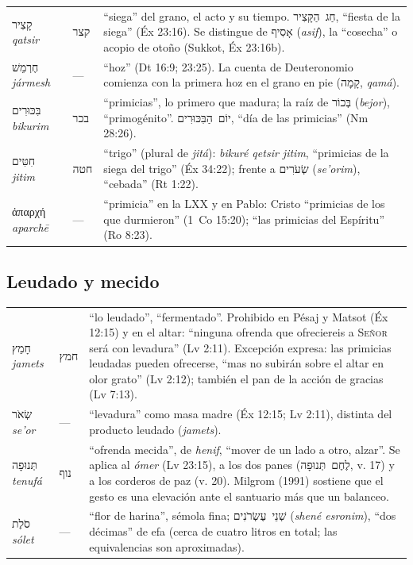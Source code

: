 \documentclass[11pt,letterpaper]{article}
\newcommand{\heb}[1]{\mbox{\foreignlanguage{hebrew}{#1}}}
\newcommand{\grc}[1]{\foreignlanguage{ancientgreek}{#1}}
\newcommand{\SENOR}{\textsc{Señor}}
\begin{document}
\begin{filologia}
\begin{tabular}{@{}L{3.3cm}L{1.5cm}L{9.85cm}@{}}
\heb{קָצִיר} \emph{qatsir} & \heb{קצר} & ``siega'' del grano, el acto y su tiempo. \heb{חַג הַקָּצִיר}, ``fiesta de la siega'' (Éx 23:16). Se distingue de \heb{אָסִיף} (\emph{asif}), la ``cosecha'' o acopio de otoño (Sukkot, Éx 23:16b). \\[2pt]
\heb{חֶרְמֵשׁ} \emph{jármesh} & --- & ``hoz'' (Dt 16:9; 23:25). La cuenta de Deuteronomio comienza con la primera hoz en el grano en pie (\heb{קָמָה}, \emph{qamá}). \\[2pt]
\heb{בִּכּוּרִים} \emph{bikurim} & \heb{בכר} & ``primicias'', lo primero que madura; la raíz de \heb{בְּכוֹר} (\emph{bejor}), ``primogénito''. \heb{יוֹם הַבִּכּוּרִים}, ``día de las primicias'' (Nm 28:26). \\[2pt]
\heb{חִטִּים} \emph{jitim} & \heb{חטה} & ``trigo'' (plural de \emph{jitá}): \emph{bikuré qetsir jitim}, ``primicias de la siega del trigo'' (Éx 34:22); frente a \heb{שְׂעֹרִים} (\emph{se'orim}), ``cebada'' (Rt 1:22). \\[2pt]
\grc{ἀπαρχή} \emph{aparchē} & --- & ``primicia'' en la LXX y en Pablo: Cristo ``primicias de los que durmieron'' (1~Co 15:20); ``las primicias del Espíritu'' (Ro 8:23). \\
\end{tabular}
\end{filologia}

\subsection{Leudado y mecido}

\begin{filologia}
\begin{tabular}{@{}L{3.3cm}L{1.5cm}L{9.85cm}@{}}
\heb{חָמֵץ} \emph{jamets} & \heb{חמץ} & ``lo leudado'', ``fermentado''. Prohibido en Pésaj y Matsot (Éx 12:15) y en el altar: ``ninguna ofrenda que ofreciereis a \SENOR{} será con levadura'' (Lv 2:11). Excepción expresa: las primicias leudadas pueden ofrecerse, ``mas no subirán sobre el altar en olor grato'' (Lv 2:12); también el pan de la acción de gracias (Lv 7:13). \\[2pt]
\heb{שְׂאֹר} \emph{se'or} & --- & ``levadura'' como masa madre (Éx 12:15; Lv 2:11), distinta del producto leudado (\emph{jamets}). \\[2pt]
\heb{תְּנוּפָה} \emph{tenufá} & \heb{נוף} & ``ofrenda mecida'', de \emph{henif}, ``mover de un lado a otro, alzar''. Se aplica al \emph{ómer} (Lv 23:15), a los dos panes (\heb{לֶחֶם תְּנוּפָה}, v. 17) y a los corderos de paz (v. 20). Milgrom (1991) sostiene que el gesto es una elevación ante el santuario más que un balanceo. \\[2pt]
\heb{סֹלֶת} \emph{sólet} & --- & ``flor de harina'', sémola fina; \heb{שְׁנֵי עֶשְׂרֹנִים} (\emph{shené esronim}), ``dos décimas'' de efa (cerca de cuatro litros en total; las equivalencias son aproximadas). \\
\end{tabular}
\end{filologia}
\end{document}

